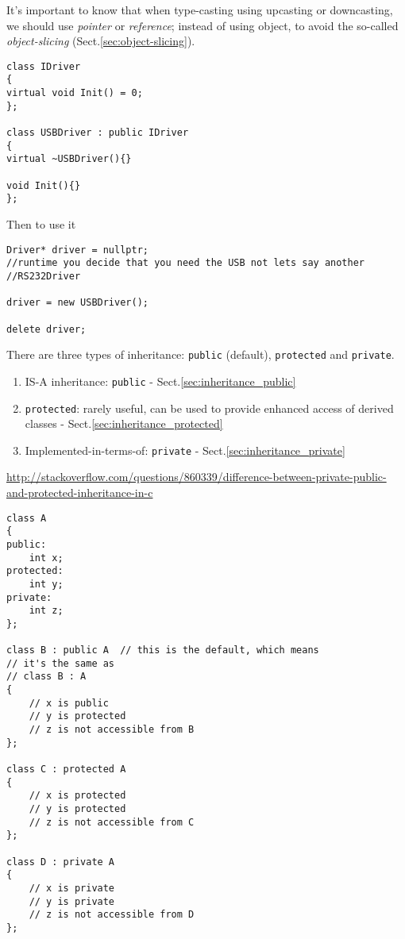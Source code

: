 It's important to know that when type-casting using upcasting or downcasting, we
should use {\it pointer} or {\it reference}; instead of using object, to avoid
the so-called {\it object-slicing} (Sect.\ref{sec:object-slicing}).


\begin{verbatim}
class IDriver
{
virtual void Init() = 0;
};

class USBDriver : public IDriver
{
virtual ~USBDriver(){}

void Init(){}
};
\end{verbatim}

Then to use it
\begin{verbatim}
Driver* driver = nullptr;
//runtime you decide that you need the USB not lets say another //RS232Driver

driver = new USBDriver();

delete driver;
\end{verbatim}

There are three types of inheritance: \verb!public! (default), \verb!protected!
and \verb!private!. 
\begin{enumerate}
  \item IS-A inheritance: \verb!public! - Sect.\ref{sec:inheritance_public}
  
  \item \verb!protected!: rarely useful, can be used to provide enhanced
  access of derived classes - Sect.\ref{sec:inheritance_protected}
  
  \item Implemented-in-terms-of: \verb!private! - Sect.\ref{sec:inheritance_private}
\end{enumerate}

\url{http://stackoverflow.com/questions/860339/difference-between-private-public-and-protected-inheritance-in-c}

\begin{verbatim}
class A 
{
public:
    int x;
protected:
    int y;
private:
    int z;
};

class B : public A  // this is the default, which means
// it's the same as
// class B : A 
{
    // x is public
    // y is protected
    // z is not accessible from B
};

class C : protected A
{
    // x is protected
    // y is protected
    // z is not accessible from C
};

class D : private A
{
    // x is private
    // y is private
    // z is not accessible from D
};
\end{verbatim}


